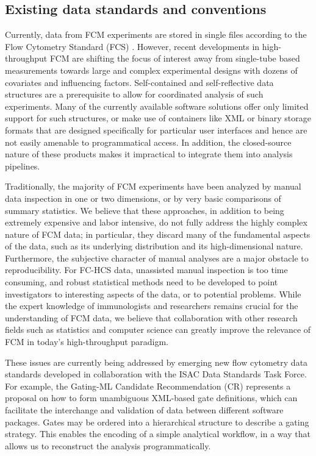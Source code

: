 \documentclass[12pt]{article}
\begin{document}
\subsection*{Existing data standards and conventions}
Currently, data from FCM experiments are stored in single files
according to the Flow Cytometry Standard (FCS) \citep{seamer1997pnd}.
However, recent developments in high-throughput FCM are shifting the
focus of interest away from single-tube based measurements towards
large and complex experimental designs with dozens of covariates and
influencing factors. Self-contained and self-reflective data
structures are a prerequisite to allow for coordinated analysis of
such experiments. Many of the currently available software solutions
offer only limited support for such structures, or make use of
containers like XML or binary storage formats that are designed
specifically for particular user interfaces and hence are not easily
amenable to programmatical access. In addition, the closed-source
nature of these products makes it impractical to integrate them into
analysis pipelines.

Traditionally, the majority of FCM experiments have been analyzed by
manual data inspection in one or two dimensions, or by very basic
comparisons of summary statistics. We believe that these approaches,
in addition to being extremely expensive and labor intensive, do not
fully address the highly complex nature of FCM data; in particular,
they discard many of the fundamental aspects of the data, such as its
underlying distribution and its high-dimensional nature. Furthermore,
the subjective character of manual analyses are a major obstacle to
reproducibility. For FC-HCS data, unassisted manual inspection is too
time consuming, and robust statistical methods need to be developed to
point investigators to interesting aspects of the data, or to
potential problems. While the expert knowledge of immunologists and
researchers remains crucial for the understanding of FCM data, we
believe that collaboration with other research fields such as
statistics and computer science can greatly improve the relevance of
FCM in today's high-throughput paradigm.

These issues are currently being addressed by emerging new flow
cytometry data standards developed in collaboration with the ISAC Data
Standards Task Force.  For example, the Gating-ML Candidate
Recommendation (CR) represents a proposal on how to form unambiguous
XML-based gate definitions, which can facilitate the interchange and
validation of data between different software packages. Gates may be
ordered into a hierarchical structure to describe a gating
strategy. This enables the encoding of a simple analytical workflow,
in a way that allows us to reconstruct the analysis programmatically.
\end{document}
